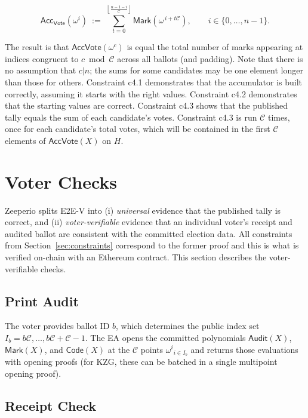 $$
\mathsf{Acc}_{\mathsf{Vote}}(\omega^i)\ :=\ \sum_{t=0}^{\left\lfloor\frac{n-1-i}{\mathcal{C}}\right\rfloor}\mathsf{Mark}\!\left(\omega^{\,i+t\mathcal{C}}\right),
\qquad i\in\{0,\ldots,n-1\}.
$$

\noindent  The result is that $\mathsf{Acc}{\mathsf{Vote}}(\omega^c)$ is equal the total number of marks appearing at indices congruent to $c \bmod \mathcal{C}$ across all ballots (and padding). Note that there is no assumption that $c | n$; the sums for some candidates may be one element longer than those for others. Constraint c4.1 demonstrates that the accumulator is built correctly, assuming it starts with the right values. Constraint c4.2 demonstrates that the starting values are correct. Constraint c4.3 shows that the published tally equals the sum of each candidate's votes. Constraint c4.3 is run $\mathcal{C}$ times, once for each candidate's total votes, which will be contained in the first $\mathcal{C}$ elements of  $\mathsf{Acc}{\mathsf{Vote}}(X)$ on $H$.

\section{Voter Checks}
\label{sec:voter}

Zeeperio splits E2E-V into (i) \emph{universal} evidence that the
published tally is correct, and (ii) \emph{voter-verifiable} evidence that an individual voter’s receipt
and audited ballot are consistent with the committed election data.
All constraints from Section~\ref{sec:constraints} correspond to the former proof and this is what is verified on-chain with an Ethereum contract. This section describes the voter-verifiable checks.

\subsection{Print Audit}
\label{sec:print}

The voter provides ballot ID $b$, which determines the public index set $I_b={b\mathcal{C},\ldots,b\mathcal{C}+\mathcal{C}-1}$. The EA opens the committed polynomials $\mathsf{Audit}(X)$, $\mathsf{Mark}(X)$, and $\mathsf{Code}(X)$ at the $\mathcal{C}$ points ${\omega^i}_{i\in I_b}$ and returns those evaluations with opening proofs (for KZG, these can be batched in a single multipoint opening proof).

\subsection{Receipt Check}
\label{sec:receipt}

